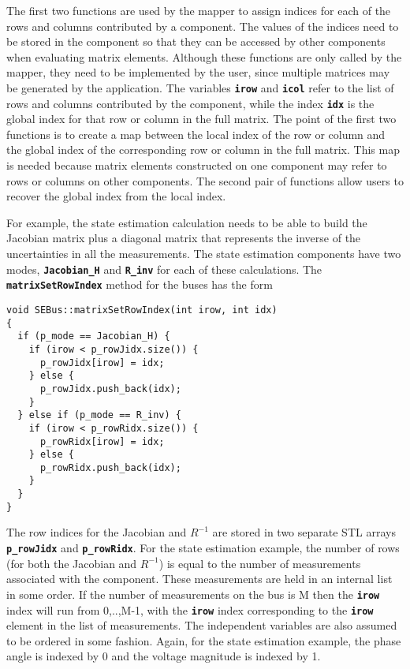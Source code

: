 The first two functions are used by the mapper to assign indices for each of the rows and columns contributed by a component. The values of the indices need to be stored in the component so that they can be accessed by other components when evaluating matrix elements. Although these functions are only called by the mapper, they need to be implemented by the user, since multiple matrices may be generated by the application. The variables \texttt{\textbf{irow}} and \texttt{\textbf{icol}} refer to the list of rows and columns contributed by the component, while the index \texttt{\textbf{idx}} is the global index for that row or column in the full matrix. The point of the first two functions is to create a map between the local index of the row or column and the global index of the corresponding row or column in the full matrix. This map is needed because matrix elements constructed on one component may refer to rows or columns on other components. The second pair of functions allow users to recover the global index from the local index.

For example, the state estimation calculation needs to be able to build the Jacobian matrix plus a diagonal matrix that represents the inverse of the uncertainties in all the measurements. The state estimation components have two modes, \texttt{\textbf{Jacobian\_H}} and \texttt{\textbf{R\_inv}} for each of these calculations. The \texttt{\textbf{matrixSetRowIndex}} method for the buses has the form

{
\color{red}
\begin{Verbatim}[fontseries=b]
void SEBus::matrixSetRowIndex(int irow, int idx)
{
  if (p_mode == Jacobian_H) {
    if (irow < p_rowJidx.size()) {
      p_rowJidx[irow] = idx;
    } else {
      p_rowJidx.push_back(idx);
    }
  } else if (p_mode == R_inv) {
    if (irow < p_rowRidx.size()) {
      p_rowRidx[irow] = idx;
    } else {
      p_rowRidx.push_back(idx);
    }
  }
}
\end{Verbatim}
}

The row indices for the Jacobian and $R^{-1}$ are stored in two separate STL
arrays \texttt{\textbf{p\_rowJidx}} and \texttt{\textbf{p\_rowRidx}}. For the
state estimation example, the number of rows (for both the Jacobian and $R^{-1}$) is equal to the number of measurements associated with the component. These measurements are held in an internal list in some order. If the number of measurements on the bus is M then the \texttt{\textbf{irow}} index will run from 0,..,M-1, with the \texttt{\textbf{irow}} index corresponding to the \texttt{\textbf{irow}} element in the list of measurements. The independent variables are also assumed to be ordered in some fashion. Again, for the state estimation example, the phase angle is indexed by 0 and the voltage magnitude is indexed by 1. 


